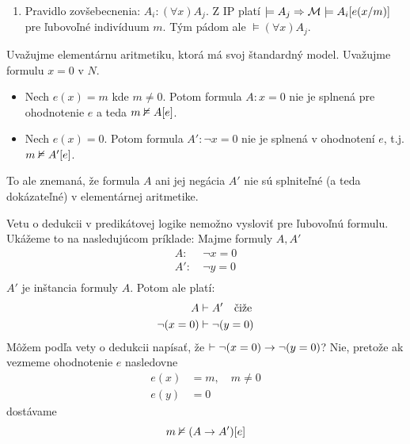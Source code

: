 \begin{dokaz}
\begin{enumerate}
\begin{enumerate}
        \item Pravidlo zovšebecnenia: $A_i: (\forall x) A_j$.
            Z IP platí $\models A_j \Rightarrow
                \mathcal{M} \models A_i[e(x/m)]$
            pre ľubovoľné indivíduum $m$. Tým pádom ale
            $\models (\forall x) A_j$.
            
        \end{enumerate}
    \end{enumerate}
\end{dokaz}


\begin{priklad} %
    Uvažujme elementárnu aritmetiku, ktorá má svoj štandardný
    model. Uvažujme formulu $x=0$ v $N$.
    \begin{itemize}
        \item Nech $e(x) = m$ kde $m \neq 0$. Potom formula $A:x=0$ nie je
        splnená pre ohodnotenie $e$ a teda $m \nvDash A[e]$.
        \item Nech $e(x) = 0$. Potom formula $A': \neg x=0$ nie je
        splnená v ohodnotení $e$, t.j. $m \nvDash A'[e]$.
    \end{itemize}
    To ale znemaná, že formula $A$ ani jej negácia $A'$
    nie sú splniteľné (a teda dokázateľné) v elementárnej aritmetike.
\end{priklad}


\begin{poznamka} %
    Vetu o dedukcii v predikátovej logike nemožno vysloviť pre
    ľubovoľnú formulu. Ukážeme to na nasledujúcom príklade: Majme
    formuly $A,A'$
    \begin{align*}
            A :\ & \neg x=0 \\
            A':\ & \neg y=0 \\
    \end{align*}
    $A'$ je inštancia formuly $A$. Potom ale platí:
    \begin{align*}
            A &\vdash A'  \quad \mbox{čiže}\\
            \neg (x=0) &\vdash \neg (y=0)
    \end{align*}
    Môžem podľa vety o dedukcii napísať, že 
    $\vdash \neg (x=0) \rightarrow \neg (y=0)$? Nie, pretože ak
    vezmeme ohodnotenie $e$ nasledovne
    \begin{align*}
        e(x) &= m, \quad m \neq 0 \\
        e(y) &= 0
    \end{align*}
    dostávame
    \begin{equation*}
        m \nvDash (A \rightarrow A')[e]
    \end{equation*}
\end{poznamka}

